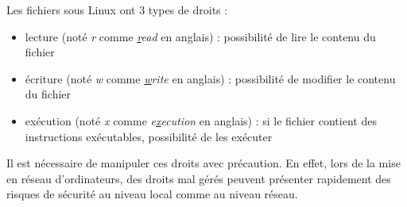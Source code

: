 \documentclass[../../../main.tex]{subfiles}
\begin{document}
Les fichiers sous Linux ont 3 types de droits :
\begin{itemize}
	\item lecture (noté \textit{r} comme \textit{\underline{r}ead} en anglais) : possibilité de lire le contenu du fichier
	\item écriture (noté \textit{w} comme \textit{\underline{w}rite} en anglais) : possibilité de modifier le contenu du fichier
	\item exécution (noté \textit{x} comme \textit{e\underline{x}ecution} en anglais) : si le fichier contient des instructions exécutables, possibilité de les exécuter
\end{itemize}
Il est nécessaire de manipuler ces droits avec précaution. En effet, lors de la mise en réseau d'ordinateurs, des droits mal gérés peuvent présenter rapidement des risques de sécurité au niveau local comme au niveau réseau.
 
\end{document}
